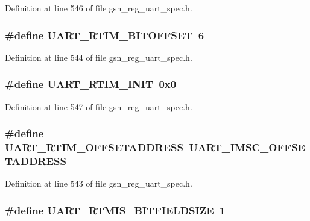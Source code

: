 Definition at line 546 of file gsn\_\-reg\_\-uart\_\-spec.h.

\hypertarget{a00575_a5c88290c46da01e3ffc069cb2b084ae7}{
\subsubsection[{UART\_\-RTIM\_\-BITOFFSET}]{\setlength{\rightskip}{0pt plus 5cm}\#define UART\_\-RTIM\_\-BITOFFSET~6}}
\label{a00575_a5c88290c46da01e3ffc069cb2b084ae7}


Definition at line 544 of file gsn\_\-reg\_\-uart\_\-spec.h.

\hypertarget{a00575_a3d1a7f72310c5ce29ef70199e4128b2e}{
\subsubsection[{UART\_\-RTIM\_\-INIT}]{\setlength{\rightskip}{0pt plus 5cm}\#define UART\_\-RTIM\_\-INIT~0x0}}
\label{a00575_a3d1a7f72310c5ce29ef70199e4128b2e}


Definition at line 547 of file gsn\_\-reg\_\-uart\_\-spec.h.

\hypertarget{a00575_aef357ab0ad33abae1591bd742945629d}{
\subsubsection[{UART\_\-RTIM\_\-OFFSETADDRESS}]{\setlength{\rightskip}{0pt plus 5cm}\#define UART\_\-RTIM\_\-OFFSETADDRESS~UART\_\-IMSC\_\-OFFSETADDRESS}}
\label{a00575_aef357ab0ad33abae1591bd742945629d}


Definition at line 543 of file gsn\_\-reg\_\-uart\_\-spec.h.

\hypertarget{a00575_a9d8d6a9e39c3dcb5e8dbe5c817e44d31}{
\subsubsection[{UART\_\-RTMIS\_\-BITFIELDSIZE}]{\setlength{\rightskip}{0pt plus 5cm}\#define UART\_\-RTMIS\_\-BITFIELDSIZE~1}}
\label{a00575_a9d8d6a9e39c3dcb5e8dbe5c817e44d31}


